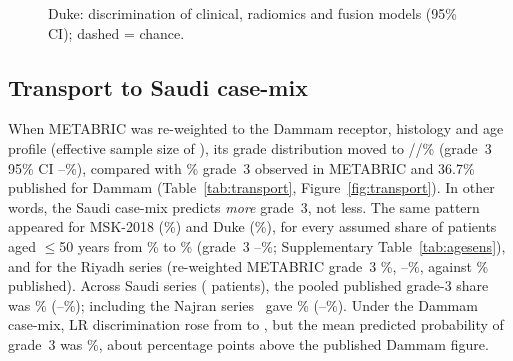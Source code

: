 \begin{table}[htbp]\centering\small
\caption{Duke-Breast-Cancer-MRI: clinical, radiomics and fusion models (nested
\RadRepeats$\times$\Folds-fold cross-validation; $L_2$-penalised multinomial LR; paired bootstrap
$\Delta$ versus the clinical model).}\label{tab:duke}
\tabfit{}
\end{table}

\begin{figure}[htbp]\centering
{}
\caption{Duke: discrimination of clinical, radiomics and fusion models (95\% CI); dashed = chance.}\label{fig:duke}
\end{figure}

\subsection{Transport to Saudi case-mix}
When METABRIC was re-weighted to the Dammam receptor, histology and age profile (effective sample
size \EssMet{} of \NRakedMet), its grade distribution moved to \RwGOneMet/\RwGTwoMet/\RwGThreeMet\%
(grade~3 95\% CI \RwGThreeMetLo--\RwGThreeMetHi\%), compared with \ObsGThreeMet\% grade~3 observed
in METABRIC and 36.7\% published for Dammam (Table~\ref{tab:transport}, Figure~\ref{fig:transport}).
In other words, the Saudi case-mix predicts \emph{more} grade~3, not less. The same pattern appeared
for MSK-2018 (\RwGThreeMsk\%) and Duke (\RwGThreeDuke\%), for every assumed share of patients aged
$\le$50 years from \AgeSensLo\% to \AgeSensHi\% (grade~3 \AgeSensMin--\AgeSensMax\%; Supplementary
Table~\ref{tab:agesens}), and for the Riyadh series (re-weighted METABRIC grade~3 \RwGThreeMetB\%,
\RwGThreeMetBLo--\RwGThreeMetBHi\%, against \SaudiGThreeB\% published). Across \PoolK{} Saudi series
(\PoolN{} patients), the pooled published grade-3 share was \PoolGThree\% (\PoolGThreeLo--\PoolGThreeHi\%);
including the Najran series~\citep{alamri2024najran} gave \PoolGThreeAll\%
(\PoolGThreeAllLo--\PoolGThreeAllHi\%). Under the Dammam case-mix, LR discrimination rose from
\AucUnwMet{} to \AucWMet{}, but the mean predicted probability of grade~3 was \PredGThreeMet\%,
about \OverPredPP{} percentage points above the published Dammam figure.

\begin{table}[htbp]\centering\small
\caption{Re-weighting to published Saudi case-mix. ESS = effective sample size of the raking weights
(first row of each block: patients with complete raking variables). Grade-3 CI: bootstrap with
re-raking. Arrows: unweighted$\to$Saudi-weighted LR discrimination. $^\dagger$Dammam
series~\citep{kussaibi2021saudi}; $^\ddagger$Riyadh series~\citep{durrani2025healthcare}
(tertiary referral centre). Pooled: DerSimonian--Laird random effects across \PoolK{} Saudi
series reporting grade~\citep{kussaibi2021saudi,durrani2025healthcare,albasri2014madinah}; the
Madinah series reports grade for invasive ductal carcinoma only and no receptor status, so it
contributes to the pooled estimate but not to raking.}\label{tab:transport}
\tabfit{}
\end{table}

